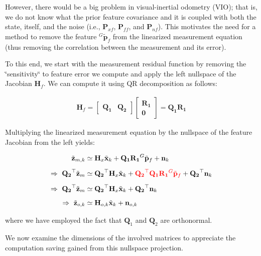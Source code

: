 However, there would be a big problem in visual-\/inertial odometry (V\+IO); that is, we do not know what the prior feature covariance and it is coupled with both the state, itself, and the noise (i.\+e., $\mathbf{P}_{xf}$, $\mathbf{P}_{ff}$, and $\mathbf{P}_{nf}$). This motivates the need for a method to remove the feature ${}^G\tilde{\mathbf{p}}_f$ from the linearized measurement equation (thus removing the correlation between the measurement and its error).

To this end, we start with the measurement residual function by removing the \char`\"{}sensitivity\char`\"{} to feature error we compute and apply the left nullspace of the Jacobian $\mathbf{H}_{f}$. We can compute it using QR decomposition as follows\+:

\begin{align*} \mathbf{H}_{f} = \begin{bmatrix} \mathbf{Q_1} & \mathbf{Q_2} \end{bmatrix} \begin{bmatrix} \mathbf{R_1} \\ \mathbf{0} \end{bmatrix} = \mathbf{Q_1}\mathbf{R_1} \end{align*}

Multiplying the linearized measurement equation by the nullspace of the feature Jacobian from the left yields\+:

\begin{align*} \tilde{\mathbf{z}}_{m,k} &\simeq \mathbf{H}_{x} \tilde{\mathbf{x}}_{k} + \mathbf{Q_1}\mathbf{R_1}{}^G\tilde{\mathbf{p}}_f + \mathbf{n}_k \\[5px] \empty \Rightarrow~ \mathbf{Q_2}^\top\tilde{\mathbf{z}}_m &\simeq \mathbf{Q_2}^\top\mathbf{H}_{x} \tilde{\mathbf{x}}_{k} + \textcolor{red}{\mathbf{Q_2}^\top\mathbf{Q_1}\mathbf{R_1} {}^G\tilde{\mathbf{p}}_f} + \mathbf{Q_2}^\top\mathbf{n}_k \\[5px] \empty \Rightarrow~ \mathbf{Q_2}^\top\tilde{\mathbf{z}}_m &\simeq \mathbf{Q_2}^\top\mathbf{H}_{x} \tilde{\mathbf{x}}_{k} + \mathbf{Q_2}^\top\mathbf{n}_k \\[5px] \empty \Rightarrow~ \tilde{\mathbf{z}}_{o,k} &\simeq \mathbf{H}_{o,k}\tilde{\mathbf{x}}_{k} + \mathbf{n}_{o,k} \end{align*}

where we have employed the fact that $\mathbf Q_1$ and $\mathbf Q_2$ are orthonormal.

We now examine the dimensions of the involved matrices to appreciate the computation saving gained from this nullspace projection.

